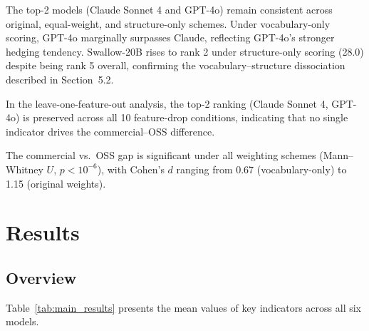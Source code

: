 \documentclass[11pt,a4paper]{article}
\begin{document}
The top-2 models (Claude Sonnet 4 and GPT-4o) remain consistent across original, equal-weight, and structure-only schemes. Under vocabulary-only scoring, GPT-4o marginally surpasses Claude, reflecting GPT-4o's stronger hedging tendency. Swallow-20B rises to rank 2 under structure-only scoring (28.0) despite being rank 5 overall, confirming the vocabulary--structure dissociation described in Section~5.2.

In the leave-one-feature-out analysis, the top-2 ranking (Claude Sonnet 4, GPT-4o) is preserved across all 10 feature-drop conditions, indicating that no single indicator drives the commercial--OSS difference.

The commercial vs.\ OSS gap is significant under all weighting schemes (Mann--Whitney $U$, $p < 10^{-6}$), with Cohen's $d$ ranging from 0.67 (vocabulary-only) to 1.15 (original weights).

\section{Results}

\subsection{Overview}

Table~\ref{tab:main_results} presents the mean values of key indicators across all six models.
\end{document}
